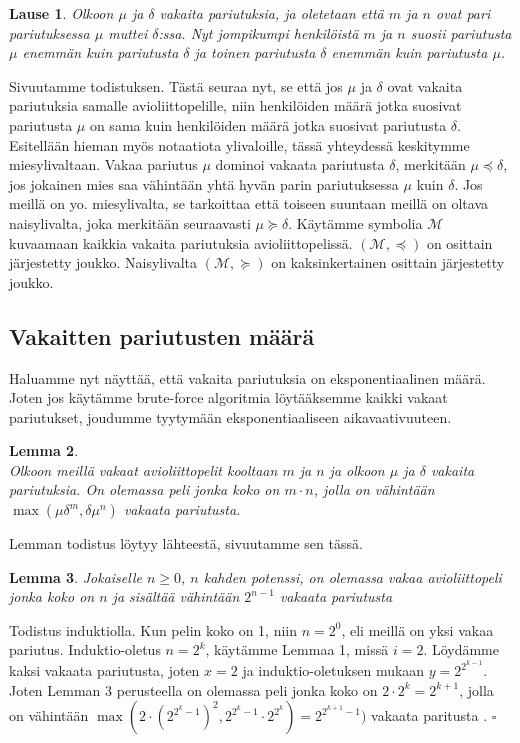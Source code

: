\documentclass[finnish]{tktltiki2}
\newtheorem{lau}{Lause}
\newtheorem{lem}[lau]{Lemma}
\theoremstyle{definition}
\theoremstyle{remark}
\begin{document}
\begin{lau} \cite[p. 18]{gusfield1989stable}
	Olkoon $\mu$ ja $\delta$ vakaita pariutuksia, ja oletetaan että $m$ ja $n$ ovat pari pariutuksessa $\mu$ muttei $\delta$:ssa. Nyt jompikumpi henkilöistä $m$ ja $n$ suosii pariutusta $\mu$ enemmän kuin pariutusta $\delta$ ja toinen pariutusta $\delta$ enemmän kuin pariutusta $\mu$.
\end{lau}
Sivuutamme todistuksen.
Tästä seuraa nyt, se että jos $\mu$ ja $\delta$ ovat vakaita pariutuksia samalle avioliittopelille, niin henkilöiden määrä jotka suosivat pariutusta $\mu$ on sama kuin henkilöiden määrä jotka suosivat pariutusta $\delta$.
Esitellään hieman myös notaatiota ylivaloille, tässä yhteydessä keskitymme miesylivaltaan.
Vakaa pariutus $\mu$ dominoi vakaata pariutusta $\delta$, merkitään $\mu \preceq \delta$, jos jokainen mies saa vähintään yhtä hyvän parin pariutuksessa $\mu$ kuin $\delta$.
Jos meillä on yo. miesylivalta, se tarkoittaa että toiseen suuntaan meillä on oltava naisylivalta, joka merkitään seuraavasti $\mu \succeq \delta$. Käytämme symbolia $\mathcal{M}$ kuvaamaan kaikkia vakaita pariutuksia avioliittopelissä. $(\mathcal{M}, \preceq)$ on osittain järjestetty joukko. Naisylivalta $(\mathcal{M}, \succeq)$ on kaksinkertainen osittain järjestetty joukko.

\subsection{Vakaitten pariutusten määrä}
Haluamme nyt näyttää, että vakaita pariutuksia on eksponentiaalinen määrä. Joten jos käytämme brute-force algoritmia löytääksemme kaikki vakaat pariutukset, joudumme tyytymään eksponentiaaliseen aikavaativuuteen.

\begin{lem} \cite[p. 23]{gusfield1989stable} \\
	Olkoon meillä vakaat avioliittopelit kooltaan $m$ ja $n$ ja olkoon $\mu$ ja $\delta$ vakaita pariutuksia. On olemassa peli jonka koko on $m \cdot n$, jolla on vähintään $\max(\mu\delta^m, \delta\mu^n)$ vakaata pariutusta.
\end{lem}
Lemman todistus löytyy lähteestä, sivuutamme sen tässä.

\begin{lem}
Jokaiselle $n \geq 0$, $n$ kahden potenssi, on olemassa vakaa avioliittopeli jonka koko on $n$ ja sisältää vähintään $2^{n-1}$ vakaata pariutusta
\end{lem}
Todistus induktiolla. Kun pelin koko on 1, niin $n = 2^0$, eli meillä on yksi vakaa pariutus. Induktio-oletus $n = 2^k$, käytämme Lemmaa 1, missä $i = 2$. Löydämme kaksi vakaata pariutusta, joten $x = 2$ ja induktio-oletuksen mukaan $y = 2^{2^{k-1}}$. Joten Lemman 3 perusteella on olemassa peli jonka koko on $2 \cdot 2^k = 2^{k+1}$, jolla on vähintään $\max(2 \cdot (2^{2^{{k}}-1})^2, 2^{2^{k}-1} \cdot 2^{2^{k}}) = 2^{2^{k+1}-1})$ vakaata paritusta \cite[p. 24]{gusfield1989stable}. $\square$
\end{document}
